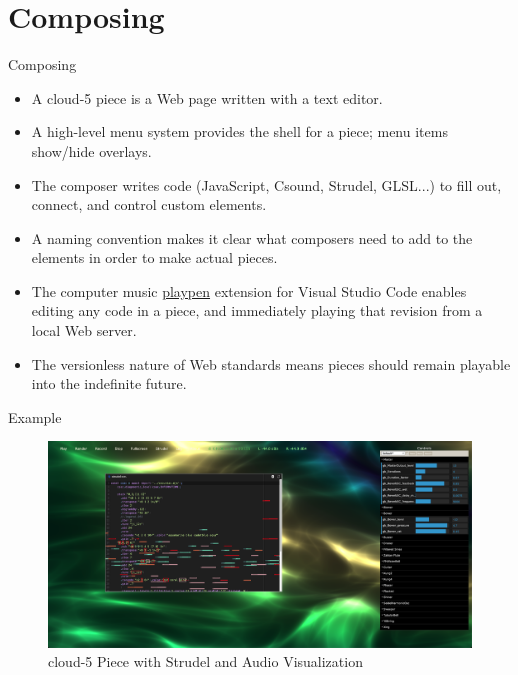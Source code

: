 \documentclass{beamer}
\begin{document}
\section{Composing}

\begin{frame}{Composing}
\begin{itemize}
\item A cloud-5 piece is a Web page written with a text editor.
\item A high-level menu system provides the shell for a piece; menu items show/hide overlays.
\item The composer writes code (JavaScript, Csound, Strudel, GLSL...) to fill out, connect, and control custom elements.
\item A naming convention makes it clear what composers need to add to the elements in order to make actual pieces.
\item The computer music \href{https://github.com/gogins/csound-ac/tree/master/vscode-playpen}{playpen} extension for Visual Studio Code enables editing any code in a piece, and immediately playing that revision from a local Web server.
\item The versionless nature of Web standards means pieces should remain playable into the indefinite future.
\end{itemize}
\end{frame}

\begin{frame}{Example}
\begin{figure}
\centering
\includegraphics[width=0.90\linewidth]{cloud5}
\caption{cloud-5 Piece with Strudel and Audio Visualization}
\label{fig:cloud5}
\end{figure}
\end{frame}
\end{document}
